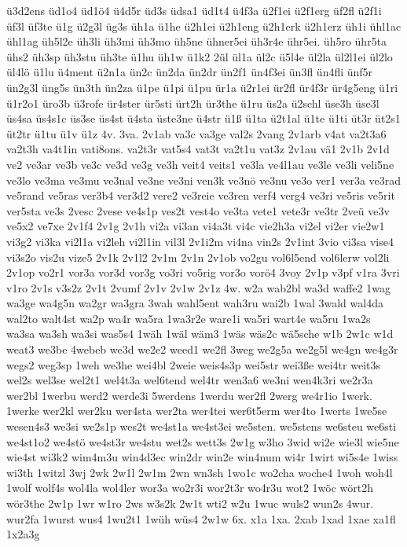 {ü3d2ens
üd1o4
üd1ö4
ü4d5r
üd3s
üdsa1
üd1t4
ü4f3a
ü2f1ei
ü2f1erg
üf2fl
ü2f1i
üf3l
üf3te
ü1g
ü2g3l
üg3s
üh1a
ü1he
ü2h1ei
ü2h1eng
ü2h1erk
ü2h1erz
üh1i
ühl1ac
ühl1ag
üh5l2e
üh3li
üh3mi
üh3mo
üh5ne
ühner5ei
üh3r4e
ühr5ei.
üh5ro
ühr5ta
ühs2
üh3sp
üh3stu
üh3te
ü1hu
üh1w
ü1k2
2ül
ül1a
ül2c
ü5l4e
ül2la
ül2l1ei
ül2lo
ül4lö
ü1lu
ü4ment
ü2n1a
ün2c
ün2da
ün2dr
ün2f1
ün4f3ei
ün3fl
ün4fli
ünf5r
ün2g3l
üng5s
ün3th
ün2za
ü1pe
ü1pi
ü1pu
ür1a
ü2r1ei
ür2fl
ür4f3r
ür4g5eng
ü1ri
ü1r2o1
üro3b
ü3rofe
ür4ster
ür5sti
ürt2h
ür3the
ü1ru
üs2a
ü2schl
üse3h
üse3l
üs4sa
üs4s1c
üs3se
üs4st
ü4sta
üste3ne
ü4str
ü1ß
ü1ta
ü2t1al
ü1te
ü1ti
üt3r
üt2s1
üt2tr
ü1tu
ü1v
ü1z
4v.
3va.
2v1ab
va3c
va3ge
val2s
2vang
2v1arb
v4at
va2t3a6
va2t3h
va4t1in
vati8ons.
va2t3r
vat5s4
vat3t
va2t1u
vat3z
2v1au
vä1
2v1b
2v1d
ve2
ve3ar
ve3b
ve3c
ve3d
ve3g
ve3h
veit4
veits1
ve3la
ve4l1au
ve3le
ve3li
veli5ne
ve3lo
ve3ma
ve3mu
ve3nal
ve3ne
ve3ni
ven3k
ve3nö
ve3nu
ve3o
ver1
ver3a
ve3rad
ve5rand
ve5ras
ver3b4
ver3d2
vere2
ve3reie
ve3ren
verf4
verg4
ve3ri
ve5ris
ve5rit
ver5sta
ve3s
2vesc
2vese
ve4s1p
ves2t
vest4o
ve3ta
vete1
vete3r
ve3tr
2veü
ve3v
ve5x2
ve7xe
2v1f4
2v1g
2v1h
vi2a
vi3an
vi4a3t
vi4c
vie2h3a
vi2el
vi2er
vie2w1
vi3g2
vi3ka
vi2l1a
vi2leh
vi2l1in
vil3l
2v1i2m
vi4na
vin2s
2v1int
3vio
vi3sa
vise4
vi3s2o
vis2u
vize5
2v1k
2v1l2
2v1m
2v1n
2v1ob
vo2gu
vol6l5end
vol6lerw
vol2li
2v1op
vo2r1
vor3a
vor3d
vor3g
vo3ri
vo5rig
vor3o
vorö4
3voy
2v1p
v3pf
v1ra
3vri
v1ro
2v1s
v3s2z
2v1t
2vumf
2v1v
2v1w
2v1z
4w.
w2a
wab2bl
wa3d
waffe2
1wag
wa3ge
wa4g5n
wa2gr
wa3gra
3wah
wahl5ent
wah3ru
wai2b
1wal
3wald
wal4da
wal2to
walt4st
wa2p
wa4r
wa5ra
1wa3r2e
ware1i
wa5ri
wart4e
wa5ru
1wa2s
wa3sa
wa3sh
wa3si
was5s4
1wäh
1wäl
wäm3
1wäs
wäs2c
wä5sche
w1b
2w1c
w1d
weat3
we3be
4webeb
we3d
we2e2
weed1
we2fl
3weg
we2g5a
we2g5l
we4gn
we4g3r
wegs2
weg3sp
1weh
we3he
wei4bl
2weie
weis4s3p
wei5str
wei3ße
wei4tr
weit3s
wel2s
wel3se
wel2t1
wel4t3a
wel6tend
wel4tr
wen3a6
we3ni
wen4k3ri
we2r3a
wer2bl
1werbu
werd2
werde3i
5werdens
1werdu
wer2fl
2werg
we4r1io
1werk.
1werke
wer2kl
wer2ku
wer4sta
wer2ta
wer4tei
wer6t5erm
wer4to
1werts
1we5se
wesen4s3
we3si
we2s1p
wes2t
we4st1a
we4st3ei
we5sten.
we5stens
we6steu
we6sti
we4st1o2
we4stö
we4st3r
we4stu
wet2s
wett3s
2w1g
w3ho
3wid
wi2e
wie3l
wie5ne
wie4st
wi3k2
wim4m3u
win4d3ec
win2dr
win2e
win4num
wi4r
1wirt
wi5s4e
1wiss
wi3th
1witzl
3wj
2wk
2w1l
2w1m
2wn
wn3sh
1wo1c
wo2cha
woche4
1woh
woh4l
1wolf
wolf4s
wol4la
wol4ler
wor3a
wo2r3i
wor2t3r
wo4r3u
wot2
1wöc
wört2h
wör3the
2w1p
1wr
w1ro
2ws
w3s2k
2w1t
wti2
w2u
1wuc
wuls2
wun2s
4wur.
wur2fa
1wurst
wus4
1wu2t1
1wüh
wüs4
2w1w
6x.
x1a
1xa.
2xab
1xad
1xae
xa1fl
1x2a3g
}
